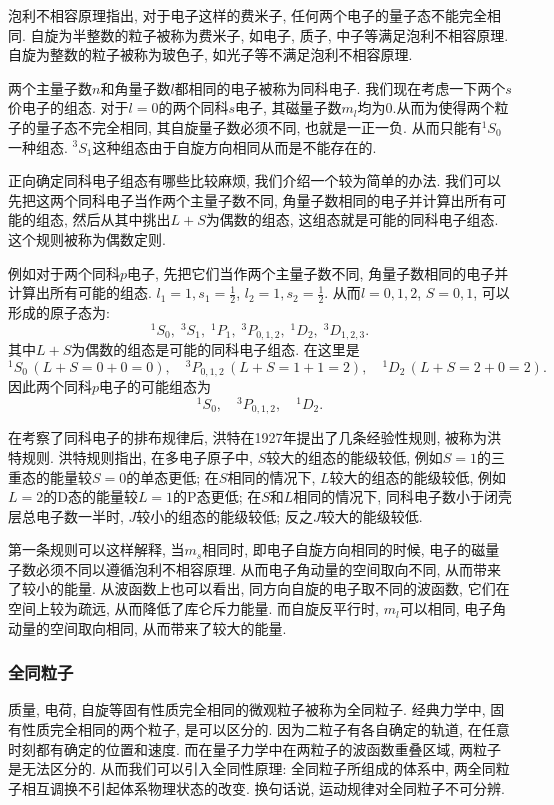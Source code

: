 泡利不相容原理指出, 对于电子这样的费米子, 任何两个电子的量子态不能完全相同. 自旋为半整数的粒子被称为费米子, 如电子, 质子, 中子等满足泡利不相容原理. 自旋为整数的粒子被称为玻色子, 如光子等不满足泡利不相容原理.

两个主量子数$n$和角量子数$l$都相同的电子被称为同科电子. 我们现在考虑一下两个$s$价电子的组态. 对于$l=0$的两个同科$s$电子, 其磁量子数$m_l$均为0.从而为使得两个粒子的量子态不完全相同, 其自旋量子数必须不同, 也就是一正一负. 从而只能有$^1S_0$一种组态. $^3S_1$这种组态由于自旋方向相同从而是不能存在的.

正向确定同科电子组态有哪些比较麻烦, 我们介绍一个较为简单的办法. 我们可以先把这两个同科电子当作两个主量子数不同, 角量子数相同的电子并计算出所有可能的组态, 然后从其中挑出$L+S$为偶数的组态, 这组态就是可能的同科电子组态. 这个规则被称为偶数定则.

例如对于两个同科$p$电子, 先把它们当作两个主量子数不同, 角量子数相同的电子并计算出所有可能的组态. $l_1=1, s_1=\frac{1}{2}$, $l_2=1, s_2=\frac{1}{2}$. 从而$l=0, 1, 2$, $S=0, 1$, 可以形成的原子态为:
\[
^1S_0, \; ^3S_1, \; ^1P_1, \; ^3P_{0, 1, 2}, \; ^1D_2, \; ^3D_{1, 2, 3}.
\]
其中$L+S$为偶数的组态是可能的同科电子组态. 在这里是
\[^1S_0\,(L+S=0+0=0), \quad ^3P_{0, 1, 2}\,(L+S=1+1=2), \quad ^1D_2\,(L+S=2+0=2).\] 因此两个同科$p$电子的可能组态为\[^1S_0, \quad  ^3P_{0, 1, 2}, \quad ^1D_2.\]

在考察了同科电子的排布规律后, 洪特在1927年提出了几条经验性规则, 被称为洪特规则. 洪特规则指出, 在多电子原子中, $S$较大的组态的能级较低, 例如$S=1$的三重态的能量较$S=0$的单态更低; 在$S$相同的情况下, $L$较大的组态的能级较低, 例如$L=2$的D态的能量较$L=1$的P态更低; 在$S$和$L$相同的情况下, 同科电子数小于闭壳层总电子数一半时, $J$较小的组态的能级较低; 反之$J$较大的能级较低.


第一条规则可以这样解释, 当$m_s$相同时, 即电子自旋方向相同的时候, 电子的磁量子数必须不同以遵循泡利不相容原理. 从而电子角动量的空间取向不同, 从而带来了较小的能量. 从波函数上也可以看出, 同方向自旋的电子取不同的波函数, 它们在空间上较为疏远, 从而降低了库仑斥力能量. 而自旋反平行时, $m_l$可以相同, 电子角动量的空间取向相同, 从而带来了较大的能量.

\subsubsection{全同粒子}
质量, 电荷, 自旋等固有性质完全相同的微观粒子被称为全同粒子. 经典力学中, 固有性质完全相同的两个粒子, 是可以区分的. 因为二粒子有各自确定的轨道, 在任意时刻都有确定的位置和速度. 而在量子力学中在两粒子的波函数重叠区域, 两粒子是无法区分的. 从而我们可以引入全同性原理: 全同粒子所组成的体系中, 两全同粒子相互调换不引起体系物理状态的改变. 换句话说, 运动规律对全同粒子不可分辨.

